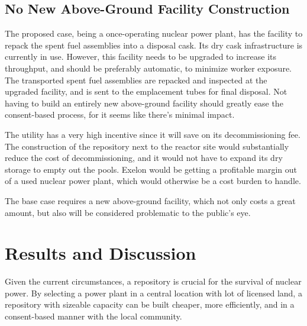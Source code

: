 \subsection{No New Above-Ground Facility Construction}



The proposed case, being a once-operating nuclear power plant, has the facility to 
repack the spent fuel assemblies into a disposal cask. Its dry cask infrastructure 
is currently in use. However, this facility needs to be upgraded to increase its throughput, and should be preferably automatic, to minimize worker exposure. The transported spent fuel assemblies are repacked and inspected at the upgraded facility, and is sent to the emplacement tubes for final disposal. Not having to build an entirely new above-ground facility should greatly ease the consent-based process, for it seems like there's minimal impact. 
 
The utility has a very high incentive since it will save on its decommissioning fee.
The construction of the repository next to the reactor site would substantially
reduce the cost of decommissioning, and it would not have to expand its dry storage
to empty out the pools. Exelon would be getting a profitable margin out of a
used nuclear power plant, which would otherwise be a cost burden to handle.

The base case requires a new above-ground facility, which not only costs a great
amount, but also will be considered problematic to the public's eye. 


\section{Results and Discussion}
Given the current circumstances, a repository is crucial for the survival of nuclear
power. By selecting a power plant in a central location with lot of licensed land,
a repository with sizeable capacity can be built cheaper, more efficiently, and 
in a consent-based manner with the local community. 
